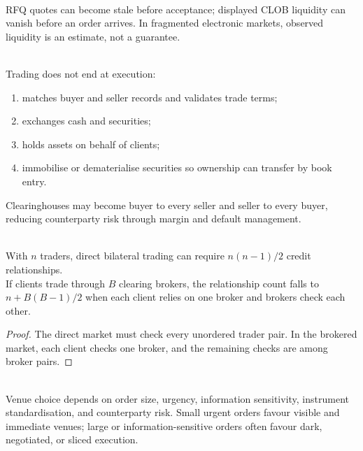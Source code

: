 \begin{caveat} \\
RFQ quotes can become stale before acceptance; displayed CLOB liquidity can vanish before an order arrives. In fragmented electronic markets, observed liquidity is an estimate, not a guarantee.
\end{caveat}

\begin{process} \\
Trading does not end at execution:
\begin{enumerate}[label=\roman*.]
\setlength{\itemsep}{0pt}
\item {} matches buyer and seller records and validates trade terms;
\item {} exchanges cash and securities;
\item {} holds assets on behalf of clients;
\item {} immobilise or dematerialise securities so ownership can transfer by book entry.
\end{enumerate}
Clearinghouses may become buyer to every seller and seller to every buyer, reducing counterparty risk through margin and default management.
\end{process}

\begin{proposition} \\
With $n$ traders, direct bilateral trading can require $n(n-1)/2$ credit relationships.\\
If clients trade through $B$ clearing brokers, the relationship count falls to $n+B(B-1)/2$ when each client relies on one broker and brokers check each other.
\begin{proof}
The direct market must check every unordered trader pair. In the brokered market, each client checks one broker, and the remaining checks are among broker pairs.
\end{proof}
\end{proposition}

\begin{practitionernote} \\
Venue choice depends on order size, urgency, information sensitivity, instrument standardisation, and counterparty risk. Small urgent orders favour visible and immediate venues; large or information-sensitive orders often favour dark, negotiated, or sliced execution.
\end{practitionernote}

